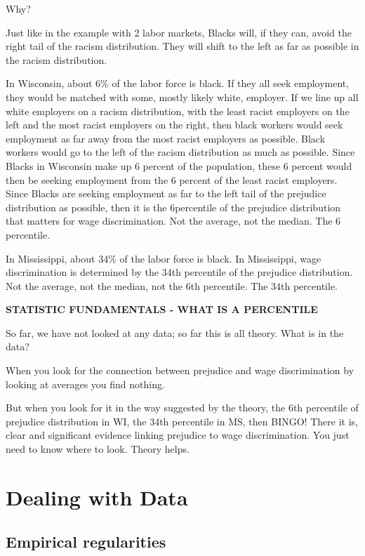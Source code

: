 \documentclass[
]{book}
\begin{document}
Why?

Just like in the example with 2 labor markets, Blacks will, if they can, avoid the right tail of the racism distribution. They will shift to the left as far as possible in the racism distribution.

In Wisconsin, about 6\% of the labor force is black. If they all seek employment, they would be matched with some, mostly likely white, employer. If we line up all white employers on a racism distribution, with the least racist employers on the left and the most racist employers on the right, then black workers would seek employment as far away from the most racist employers as possible. Black workers would go to the left of the racism distribution as much as possible. Since Blacks in Wisconsin make up 6 percent of the population, these 6 percent would then be seeking employment from the 6 percent of the least racist employers. Since Blacks are seeking employment as far to the left tail of the prejudice distribution as possible, then it is the 6percentile of the prejudice distribution that matters for wage discrimination. Not the average, not the median. The 6 percentile.

In Mississippi, about 34\% of the labor force is black. In Mississippi, wage discrimination is determined by the 34th percentile of the prejudice distribution. Not the average, not the median, not the 6th percentile. The 34th percentile.

\textbf{STATISTIC FUNDAMENTALS - WHAT IS A PERCENTILE}

So far, we have not looked at any data; so far this is all theory.
What is in the data?

When you look for the connection between prejudice and wage discrimination by looking at averages you find nothing.

But when you look for it in the way suggested by the theory, the 6th percentile of prejudice distribution in WI, the 34th percentile in MS, then BINGO! There it is, clear and significant evidence linking prejudice to wage discrimination. You just need to know where to look. Theory helps.

\hypertarget{dealing-with-data}{%
\section{Dealing with Data}\label{dealing-with-data}}

\hypertarget{empirical-regularities}{%
\subsection{Empirical regularities}\label{empirical-regularities}}
\end{document}

